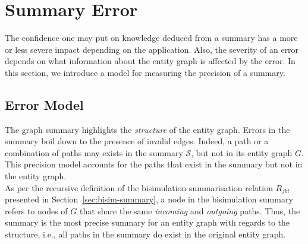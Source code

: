 \section{Summary Error}

The confidence one may put on knowledge deduced from a summary has a more or less severe impact depending on the application. Also, the severity of an error depends on what information about the entity graph is affected by the error. In this section, we introduce a model for measuring the precision of a summary.

\subsection{Error Model}

The graph summary highlights the \emph{structure} of the entity graph. Errors in the summary boil down to the presence of invalid edges. Indeed, a path or a combination of paths may exists in the summary $\mathcal{S}$, but not in its entity graph $G$. This precision model accounts for the paths that exist in the summary but not in the entity graph.\\

%

As per the recursive definition of the bisimulation summarisation relation $R_{fbt}$ presented in Section~\ref{sec:bisim-summary}, a node in the bisimulation summary  refers to nodes of $G$ that share the same \emph{incoming} and \emph{outgoing} paths. Thus, the  summary is the most precise summary for an entity graph with regards to the structure, i.e., all paths in the summary do exist in the original entity graph.

